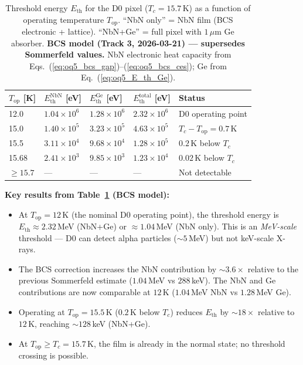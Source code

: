 \begin{table}[ht]
\centering
\caption{Threshold energy $E_\mathrm{th}$ for the D0 pixel
($T_c = 15.7$\,K) as a function of operating temperature
$T_\mathrm{op}$. ``NbN only'' = NbN film (BCS electronic + lattice).
``NbN+Ge'' = full pixel with $1\,\mu$m Ge absorber.
\textbf{BCS model (Track 3, 2026-03-21) --- supersedes Sommerfeld values.}
NbN electronic heat capacity from
Eqs.~(\ref{eq:oq5_bcs_gap})--(\ref{eq:oq5_bcs_ces});
Ge from Eq.~(\ref{eq:oq5_E_th_Ge}).}
\label{tab:oq5_E_th}
\small
\begin{tabular}{@{}lllll@{}}
\toprule
$T_\mathrm{op}$ [K] &
$E_\mathrm{th}^\mathrm{NbN}$ [eV] &
$E_\mathrm{th}^\mathrm{Ge}$ [eV] &
$E_\mathrm{th}^\mathrm{total}$ [eV] &
Status \\
\midrule
12.0  & $1.04 \times 10^6$ & $1.28 \times 10^6$ & $2.32 \times 10^6$ &
  D0 operating point \\
15.0  & $1.40 \times 10^5$ & $3.23 \times 10^5$ & $4.63 \times 10^5$ &
  $T_c - T_\mathrm{op} = 0.7$\,K \\
15.5  & $3.11 \times 10^4$ & $9.68 \times 10^4$ & $1.28 \times 10^5$ &
  $0.2$\,K below $T_c$ \\
15.68 & $2.41 \times 10^3$ & $9.85 \times 10^3$ & $1.23 \times 10^4$ &
  $0.02$\,K below $T_c$ \\
$\geq 15.7$ & --- & --- & --- &
  Not detectable \\
\bottomrule
\end{tabular}
\end{table}

\noindent \textbf{Key results from Table~\ref{tab:oq5_E_th} (BCS model):}

\begin{itemize}
  \item At $T_\mathrm{op} = 12$\,K (the nominal D0 operating point),
    the threshold energy is $E_\mathrm{th} \approx 2.32$\,MeV
    (NbN+Ge) or $\approx 1.04$\,MeV (NbN only).
    This is an \emph{MeV-scale} threshold --- D0 can detect alpha
    particles ($\sim 5$\,MeV) but not keV-scale X-rays.
  \item The BCS correction increases the NbN contribution by
    $\sim\!3.6\times$ relative to the previous Sommerfeld estimate
    ($1.04$\,MeV vs $288$\,keV). The NbN and Ge contributions are
    now comparable at $12$\,K ($1.04$\,MeV NbN vs $1.28$\,MeV Ge).
  \item Operating at $T_\mathrm{op} = 15.5$\,K ($0.2$\,K below
    $T_c$) reduces $E_\mathrm{th}$ by $\sim 18\times$ relative to
    $12$\,K, reaching $\sim 128$\,keV (NbN+Ge).
  \item At $T_\mathrm{op} \geq T_c = 15.7$\,K, the film is already
    in the normal state; no threshold crossing is possible.
\end{itemize}

